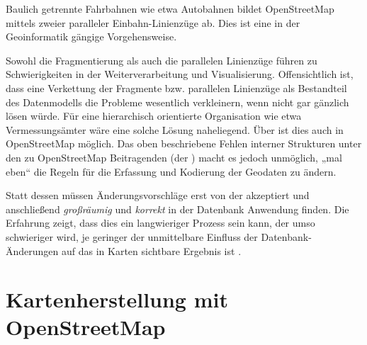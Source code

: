 \documentclass[../main/thesis.tex]{subfiles}
\begin{document}
\begin{draft}

Baulich getrennte Fahrbahnen wie etwa Autobahnen bildet OpenStreetMap mittels zweier paralleler Einbahn-Linienzüge ab. 
Dies ist eine in der Geoinformatik gängige Vorgehensweise. 

Sowohl die Fragmentierung als auch die parallelen Linienzüge führen zu Schwierigkeiten in der Weiterverarbeitung und Visualisierung. \noref[Mig12 u. a.]
Offensichtlich ist, dass eine Verkettung der Fragmente bzw. parallelen Linienzüge als Bestandteil des Datenmodells die Probleme wesentlich verkleinern, wenn nicht gar gänzlich lösen würde.
Für eine hierarchisch orientierte Organisation wie etwa Vermessungsämter wäre eine solche Lösung naheliegend.
Über  ist dies auch in OpenStreetMap möglich. 
Das oben beschriebene Fehlen interner Strukturen unter den zu OpenStreetMap Beitragenden (der ) macht es jedoch unmöglich, „mal eben“ die Regeln für die Erfassung und Kodierung der Geodaten zu ändern. 


Statt dessen müssen Änderungsvorschläge erst von der  akzeptiert und anschließend \emph{großräumig} und \emph{korrekt} in der Datenbank Anwendung finden.
Die Erfahrung zeigt, dass dies ein langwieriger Prozess sein kann, der umso schwieriger wird, je geringer der unmittelbare Einfluss der Datenbank-Änderungen auf das in Karten sichtbare Ergebnis ist \noref.


\end{draft}




\section{Kartenherstellung mit OpenStreetMap} \label{kartenherstellung}
\end{document}
